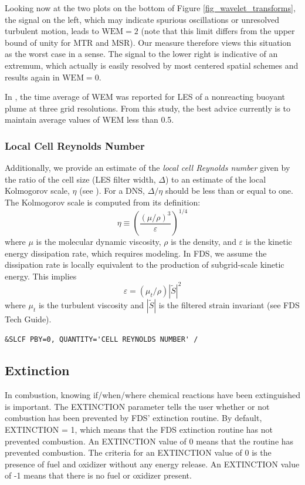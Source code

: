 \documentclass[11pt]{book}
\begin{document}
Looking now at the two plots on the bottom of Figure \ref{fig_wavelet_transforms}, the signal on the left, which may indicate spurious oscillations or unresolved turbulent motion, leads to $\mbox{WEM} = 2$ (note that this limit differs from the upper bound of unity for MTR and MSR).  Our measure therefore views this situation as the worst case in a sense.  The signal to the lower right is indicative of an extremum, which actually is easily resolved by most centered spatial schemes and results again in $\mbox{WEM}=0$.

In \cite{McDermott:2010}, the time average of WEM was reported for LES of a nonreacting buoyant plume at three grid resolutions.  From this study, the best advice currently is to maintain average values of WEM less than 0.5.

\subsubsection{Local Cell Reynolds Number}

Additionally, we provide an estimate of the \emph{local cell Reynolds number} given by the ratio of the cell size (LES filter width, $\Delta$) to an estimate of the local Kolmogorov scale, $\eta$ (see \cite{Pope:2000}).  For a DNS, $\Delta/\eta$ should be less than or equal to one. The Kolmogorov scale is computed from its definition:
\begin{equation}
\eta \equiv \left(\frac{(\mu/\rho)^3}{\varepsilon}\right)^{1/4}
\end{equation}
where $\mu$ is the molecular dynamic viscosity, $\rho$ is the density, and $\varepsilon$ is the kinetic energy dissipation rate, which requires modeling.  In FDS, we assume the dissipation rate is locally equivalent to the production of subgrid-scale kinetic energy.  This implies
\begin{equation}
\varepsilon = (\mu_t/\rho)|\tilde{S}|^2
\end{equation}
where $\mu_t$ is the turbulent viscosity and $|\tilde{S}|$ is the filtered strain invariant (see FDS Tech Guide).

\begin{lstlisting}
&SLCF PBY=0, QUANTITY='CELL REYNOLDS NUMBER' /
\end{lstlisting}

\subsection{Extinction}
\label{info:extinct_out}
In combustion, knowing if/when/where chemical reactions have been extinguished is important. The {\ct EXTINCTION} parameter tells the user whether or not combustion has been prevented by FDS' extinction routine. By default, {\ct EXTINCTION} = 1, which means that the FDS extinction routine has not prevented combustion. An {\ct EXTINCTION} value of 0 means that the routine has prevented combustion. The criteria for an {\ct EXTINCTION} value of 0 is the presence of fuel and oxidizer without any energy release. An {\ct EXTINCTION} value of -1 means that there is no fuel or oxidizer present.
\end{document}
